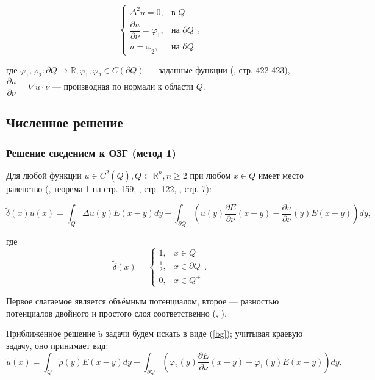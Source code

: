 \documentclass[a4paper]{article}
\newcommand{\R}[1]{\mathbb{R}^#1}
\newcommand{\der}[2]{\dfrac{\partial #1}{\partial #2}}
\begin{document}
\[
  \begin{cases}
    \Delta^2 u=0,           & \text{в $Q$}           \\
    \der{u}{\nu}=\varphi_1, & \text{на $\partial Q$} \\
    u=\varphi_2,            & \text{на $\partial Q$}
  \end{cases},
\]

где $\varphi_1, \varphi_2: \partial Q \rightarrow \mathbb{R},\varphi_1, \varphi_2 \in C(\partial Q) $ --- заданные функции (\cite{samar}, стр. 422-423),
$\der{u}{\nu}=\nabla u \cdot \nu$ --- производная по нормали к области $Q$.

\subsection{Численное решение}
\subsubsection{Решение сведением к ОЗГ (метод 1)}
Для любой функции $u \in C^2(\bar Q), Q \subset \R{n}, n \geq 2$
при любом $x \in Q$ имеет место равенство (\cite{mich}, теорема 1 на стр. 159, \cite{lezh}, стр. 122, \cite{lezh2}, стр. 7):

\begin{equation}
  \tilde{\delta}(x) u(x)= \int_Q \Delta u(y) E(x-y) dy + \int_{\partial Q} \left(u(y)\der{E}{\nu}(x-y)-\der{u}{\nu}(y) E(x-y) \right) dy,
  \label{bg}
\end{equation}

где
\[
  \tilde{\delta}(x) =
  \begin{cases}
    1,           & x \in Q          \\
    \frac{1}{2}, & x \in \partial Q \\
    0,           & x \in Q^+
  \end{cases}.
\]

Первое слагаемое является объёмным потенциалом, второе --- разностью потенциалов двойного и простого слоя соответственно (\cite{agosh}, \cite{vlad}).

Приближённое решение $\tilde{u}$ задачи будем искать в виде (\ref{bg}); учитывая краевую задачу, оно принимает вид:
\begin{equation}
  \tilde{u}(x)= \int_Q \tilde{\rho}(y) E(x-y) dy + \int_{\partial Q} \left(\varphi_2(y)\der{E}{\nu}(x-y)-\varphi_1(y) E(x-y) \right) dy.
  \label{u1}
\end{equation}
\end{document}
